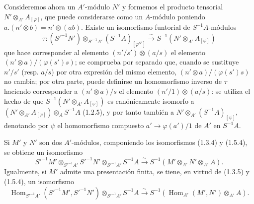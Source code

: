 \begin{env}[1.5.4]
\label{0.1.5.4-fr}
Consideremos ahora un $A'$-módulo $N'$ y formemos el producto tensorial $N'\otimes_{A'}A_{[\varphi]}$, que puede considerarse como un $A$-módulo poniendo
$a.(n'\otimes b)=n'\otimes(ab)$.
Existe un isomorfismo funtorial de $S^{-1}A$-módulos
\[
  \tau:(S'^{-1}N')\otimes_{S'^{-1}A'}(S^{-1}A)_{[\varphi^{S'}]}
  \xrightarrow{\sim}
  S^{-1}(N'\otimes_{A'}A_{[\varphi]})
\]
que hace corresponder al elemento $(n'/s')\otimes(a/s)$ el elemento
$(n'\otimes a)/(\varphi(s')s)$; se comprueba por separado que, cuando se
sustituye $n'/s'$ (resp. $a/s$) por otra expresión del mismo elemento,
$(n'\otimes a)/(\varphi(s')s)$ no cambia; por otra parte, puede definirse un
homomorfismo inverso de $\tau$ haciendo corresponder a $(n'\otimes a)/s$
el elemento $(n'/1)\otimes(a/s)$: se utiliza el hecho de que
$S^{-1}(N'\otimes_{A'}A_{[\varphi]})$ es canónicamente isomorfo a
$(N'\otimes_{A'}A_{[\varphi]})\otimes_A S^{-1}A$ (1.2.5), y por tanto también a
$N'\otimes_{A'}(S^{-1}A)_{[\psi]}$, denotando por $\psi$ el homomorfismo
compuesto $a'\to\varphi(a')/1$ de $A'$ en $S^{-1}A$.
\end{env}

\begin{env}[1.5.5]
\label{0.1.5.5-fr}
Si $M'$ y $N'$ son dos $A'$-módulos, componiendo los isomorfismos (1.3.4)
y (1.5.4), se obtiene un isomorfismo
\[
  S'^{-1}M'\otimes_{S'^{-1}A'}S'^{-1}N'
  \otimes_{S'^{-1}A'}S^{-1}A
  \xrightarrow{\sim}
  S^{-1}(M'\otimes_{A'}N'\otimes_{A'}A).
\]
Igualmente, si $M'$ admite una presentación finita, se tiene, en virtud de (1.3.5) y
(1.5.4), un isomorfismo
\[
  \operatorname{Hom}_{S'^{-1}A'}(S'^{-1}M',S'^{-1}N')
  \otimes_{S'^{-1}A'}S^{-1}A
  \xrightarrow{\sim}
  S^{-1}(\operatorname{Hom}_{A'}(M',N')\otimes_{A'}A).
\]
\end{env}

